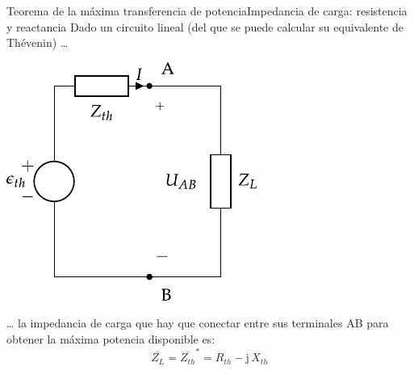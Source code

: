 \documentclass[aspectratio=169, xcolor={usenames,svgnames,dvipsnames}]{beamer}
\begin{document}
\begin{frame}{Teorema de la máxima transferencia de potencia}{Impedancia de carga: resistencia y reactancia}
Dado un circuito lineal (del que se puede calcular su equivalente de Thévenin) \ldots{}
\begin{center}
\includegraphics[height=0.45\textheight]{../figs/EquivalenteThevenin2.pdf}
\end{center}

\ldots{} la impedancia de carga que hay que conectar entre sus terminales AB para obtener la máxima potencia disponible es:
\[
  \boxed{\overline{Z_L} = \overline{Z_{th}}^*=R_{th}-\mathrm{j}\,X_{th}}
\]
\end{frame}
\end{document}
